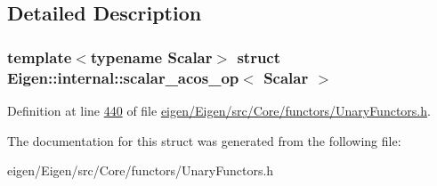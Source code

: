 \subsection{Detailed Description}
\subsubsection*{template$<$typename Scalar$>$\newline
struct Eigen\+::internal\+::scalar\+\_\+acos\+\_\+op$<$ Scalar $>$}



Definition at line \hyperlink{eigen_2_eigen_2src_2_core_2functors_2_unary_functors_8h_source_l00440}{440} of file \hyperlink{eigen_2_eigen_2src_2_core_2functors_2_unary_functors_8h_source}{eigen/\+Eigen/src/\+Core/functors/\+Unary\+Functors.\+h}.



The documentation for this struct was generated from the following file\+:\begin{DoxyCompactItemize}
\item 
eigen/\+Eigen/src/\+Core/functors/\+Unary\+Functors.\+h\end{DoxyCompactItemize}
